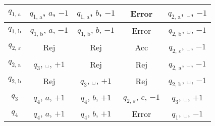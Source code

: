 \documentclass[12pt,a4paper]{article}
\newcommand{\spacesymbol}{\ensuremath{\text{\textvisiblespace}}}
\begin{document}
\begin{enumproblem}
\begin{table}[H]
\begin{tabular}{c||c|c|c|c}
                \hline
                $q_{\text{1, a}}$& $q_{\text{1, a}}$, $a$, $-1$& $q_{\text{1, a}}$, $b$, $-1$& Error& $q_{\text{2, a}}$, \spacesymbol, $-1$\\
                \hline
                $q_{\text{1, b}}$& $q_{\text{1, b}}$, $a$, $-1$& $q_{\text{1, b}}$, $b$, $-1$& Error& $q_{\text{2, b}}$, \spacesymbol, $-1$\\
                \hline
                $q_{\text{2, $\varepsilon$}}$& Rej& Rej& Acc& $q_{\text{2, $\varepsilon$}}$, \spacesymbol, $-1$\\
                \hline
                $q_{\text{2, a}}$& $q_3$, \spacesymbol, $+1$& Rej& Rej& $q_{\text{2, a}}$, \spacesymbol, $-1$\\
                \hline
                $q_{\text{2, b}}$& Rej& $q_3$, \spacesymbol, $+1$& Rej& $q_{\text{2, b}}$, \spacesymbol, $-1$\\
                \hline
                $q_3$& $q_4$, $a$, $+1$& $q_4$, $b$, $+1$& $q_{\text{2, $\varepsilon$}}$, $c$, $-1$& $q_3$, \spacesymbol, $+1$\\
                \hline
                $q_4$& $q_4$, $a$, $+1$& $q_4$, $b$, $+1$& Error& $q_1$, \spacesymbol, $-1$\\
            \end{tabular}
        \end{table}
    \end{enumproblem}

    \addtocounter{enumprb}{2}
\end{document}
